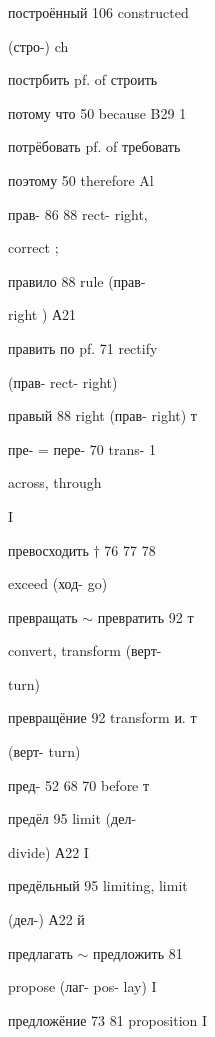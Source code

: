 \clearpage
\thispagestyle{plain}
\begingroup
\cyrillicfont
\fontsize{7.25}{8.25}\selectfont
\setlength{\parindent}{0pt}
\setlength{\parskip}{0pt}
\setlength{\emergencystretch}{1.5em}
\noindent
\begin{minipage}[t]{0.475\textwidth}
\raggedright
\noindent построённый 106 constructed\par
\noindent (стро-) ch\par
\noindent пострбить pf. of строить\par
\noindent потому что 50 because B29 1\par
\noindent потрёбовать pf. of требовать\par
\noindent поэтому 50 therefore Al\par
\noindent прав- 86 88 rect- right,\par
\noindent correct ;\par
\noindent правило 88 rule (прав-\par
\noindent right ) А21\par
\noindent править по pf. 71 rectify\par
\noindent (прав- rect- right)\par
\noindent правый 88 right (прав- right) т\par
\noindent пре- = пере- 70 trans- 1\par
\noindent across, through\par
\noindent I\par
\noindent превосходить $\dagger$ 76 77 78\par
\noindent exceed (ход- go)\par
\noindent превращать $\sim$ превратить 92 т\par
\noindent convert, transform (верт-\par
\noindent turn)\par
\noindent превращёние 92 transform и. т\par
\noindent (верт- turn)\par
\noindent пред- 52 68 70 before т\par
\noindent предёл 95 limit (дел-\par
\noindent divide) А22 I\par
\noindent предёльный 95 limiting, limit\par
\noindent (дел-) А22 й\par
\noindent предлагать $\sim$ предложить 81\par
\noindent propose (лаг- pos- lay) I\par
\noindent предложёние 73 81 proposition I\par

\end{minipage}
